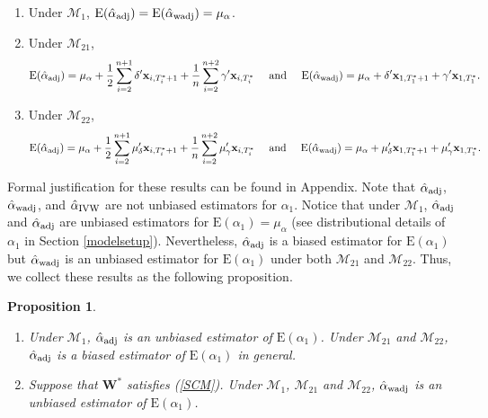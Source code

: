 \documentclass[11pt]{article}
\def\mbf#1{\mathbf{#1}} %
\def\mc#1{\mathcal{#1}} %
\def\E#1{\mathrm{E}(#1)} %
\newtheorem{prop}{Proposition}
\theoremstyle{definition}
\begin{document}
 \begin{enumerate}[label = (\roman*)]
    \item Under $\mc{M}_{1}$, $\E{\hat{\alpha}_{\rm adj}}=\E{\hat{\alpha}_{\rm wadj}} = \mu_{\alpha}$.
    \item Under $\mc{M}_{21}$, 
    \begin{align*}
      \E{\hat{\alpha}_{\rm adj}} = \mu_{\alpha} + \frac{1}{2} \sum_{i=2}^{n+1} \delta' \mbf{x}_{i, T_i^*+1} + \frac{1}{n} \sum_{i=2}^{n+2} \gamma' \mbf{x}_{i, T_i^*} 
      \quad \text{ and } \quad 
       \E{\hat{\alpha}_{\rm wadj}} = \mu_{\alpha} + \delta'\mbf{x}_{1, T_1^*+1} + \gamma' \mbf{x}_{1, T_1^*}.
    \end{align*}
    \item Under $\mc{M}_{22}$,
    \begin{align*}
      \E{\hat{\alpha}_{\rm adj}} = \mu_{\alpha} + \frac{1}{2} \sum_{i=2}^{n+1} \mu_{\delta}' \mbf{x}_{i, T_i^*+1} + \frac{1}{n} \sum_{i=2}^{n+2}  \mu_{\gamma}'\mbf{x}_{i, T_i^*} 
      \quad \text{ and } \quad 
       \E{\hat{\alpha}_{\rm wadj}} = \mu_{\alpha} + \mu_{\delta}'\mbf{x}_{1, T_1^*+1} + \mu_{\gamma}' \mbf{x}_{1, T_1^*}.
    \end{align*}
  \end{enumerate}
Formal justification for these results can be found in Appendix. Note that $\hat{\alpha}_{\rm adj}$, $\hat{\alpha}_{\rm wadj}$, and $\hat{\alpha}_{\rm IVW}$ are not unbiased estimators for $\alpha_1$. Notice that under $\mc{M}_{1}$, $\hat{\alpha}_{\rm adj}$ and $\hat{\alpha}_{\rm adj}$ are unbiased estimators for $\E{\alpha_1}=\mu_{\alpha}$ (see distributional details of $\alpha_1$ in Section \ref{modelsetup}). Nevertheless, $\hat{\alpha}_{\rm adj}$ is a biased estimator for $\E{\alpha_1}$ but $\hat{\alpha}_{\rm wadj}$ is an unbiased estimator for $\E{\alpha_1}$ under both $\mc{M}_{21}$ and $\mc{M}_{22}$. Thus, we collect these results  as the following proposition. 

\begin{prop}
\label{unbiased} 
\quad 
\begin{enumerate}[label = (\roman*)]
  \item Under $\mc{M}_1$, $\hat{\alpha}_{\rm adj}$ is an unbiased estimator of $\E{\alpha_1}$. Under $\mc{M}_{21}$ and $\mc{M}_{22}$, $\hat{\alpha}_{\rm adj}$ is a biased estimator of $\E{\alpha_1}$ in general.
  \item Suppose that $\mbf{W}^*$ satisfies (\ref{SCM}). Under $\mc{M}_{1}$, $\mc{M}_{21}$ and $\mc{M}_{22}$, $\hat{\alpha}_{\rm wadj}$ is an unbiased estimator of $\E{\alpha_1}$.
\end{enumerate}
\end{prop}
\end{document}
